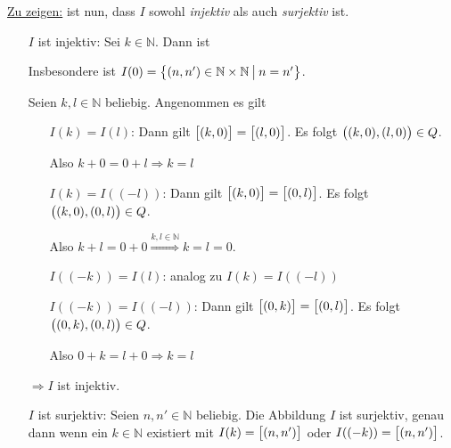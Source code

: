 \documentclass{scrreprt}
\begin{document}
\underline{Zu zeigen:} ist nun, dass $I$ sowohl \emph{injektiv} als auch
\emph{surjektiv} ist.
\begin{itemize}
\item[$I$ ist injektiv:] Sei $k \in \mathbb{N}$.
  Dann ist
  Insbesondere ist $I(0) = \qty\big{(n, n') \in \mathbb{N} \times \mathbb{N}
    \: {\big |} \: n = n'}$.

  Seien $k, l \in \mathbb{N}$ beliebig.
  Angenommen es gilt
  \begin{itemize}
  \item[$I(k) = I(l)$:] Dann gilt $\qty\big[(k, 0)] = \qty\big[(l, 0)]$.
    Es folgt $\qty\big((k, 0), (l, 0)) \in Q$.

    Also $k + 0 = 0 + l \Rightarrow k = l$

  \item[$I(k) = I((-l))$:]  Dann gilt $\qty\big[(k, 0)] = \qty\big[(0, l)]$.
    Es folgt $\qty\big((k, 0), (0, l)) \in Q$.

    Also $k + l = 0 + 0 \overset{k, l \in \mathbb{N}}\Rightarrow k = l = 0$.
  \item[$I((-k)) = I(l)$:] analog zu $I(k) = I((-l))$
  \item[$I((-k)) = I((-l))$:] Dann gilt $\qty\big[(0, k)] = \qty\big[(0, l)]$.
    Es folgt $\qty\big((0, k), (0, l)) \in Q$.

    Also $0 + k = l + 0 \Rightarrow k = l$
  \end{itemize}
  $\Rightarrow I$ ist injektiv.

\newpage
\item[$I$ ist surjektiv:] Seien $n, n' \in \mathbb{N}$ beliebig.
  Die Abbildung $I$ ist surjektiv, genau dann wenn ein $k \in \mathbb{N}$
  existiert mit
  $I(k) = \qty\big[(n, n')]$ oder $I((-k)) = \qty\big[(n, n')]$.


\end{itemize}
\end{document}
